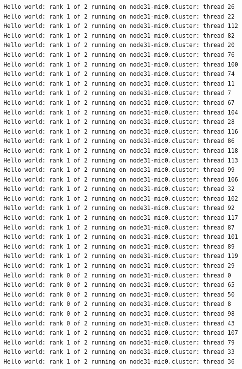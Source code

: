 \documentclass[pscyr,10pt]{hedlab}
\begin{document}
\begin{lstlisting}
  Hello world: rank 1 of 2 running on node31-mic0.cluster: thread 26
  Hello world: rank 1 of 2 running on node31-mic0.cluster: thread 22
  Hello world: rank 1 of 2 running on node31-mic0.cluster: thread 112
  Hello world: rank 1 of 2 running on node31-mic0.cluster: thread 82
  Hello world: rank 1 of 2 running on node31-mic0.cluster: thread 20
  Hello world: rank 1 of 2 running on node31-mic0.cluster: thread 76
  Hello world: rank 1 of 2 running on node31-mic0.cluster: thread 100
  Hello world: rank 1 of 2 running on node31-mic0.cluster: thread 74
  Hello world: rank 1 of 2 running on node31-mic0.cluster: thread 11
  Hello world: rank 1 of 2 running on node31-mic0.cluster: thread 7
  Hello world: rank 1 of 2 running on node31-mic0.cluster: thread 67
  Hello world: rank 1 of 2 running on node31-mic0.cluster: thread 104
  Hello world: rank 1 of 2 running on node31-mic0.cluster: thread 28
  Hello world: rank 1 of 2 running on node31-mic0.cluster: thread 116
  Hello world: rank 1 of 2 running on node31-mic0.cluster: thread 86
  Hello world: rank 1 of 2 running on node31-mic0.cluster: thread 118
  Hello world: rank 1 of 2 running on node31-mic0.cluster: thread 113
  Hello world: rank 1 of 2 running on node31-mic0.cluster: thread 99
  Hello world: rank 1 of 2 running on node31-mic0.cluster: thread 106
  Hello world: rank 1 of 2 running on node31-mic0.cluster: thread 32
  Hello world: rank 1 of 2 running on node31-mic0.cluster: thread 102
  Hello world: rank 1 of 2 running on node31-mic0.cluster: thread 92
  Hello world: rank 1 of 2 running on node31-mic0.cluster: thread 117
  Hello world: rank 1 of 2 running on node31-mic0.cluster: thread 87
  Hello world: rank 1 of 2 running on node31-mic0.cluster: thread 101
  Hello world: rank 1 of 2 running on node31-mic0.cluster: thread 89
  Hello world: rank 1 of 2 running on node31-mic0.cluster: thread 119
  Hello world: rank 1 of 2 running on node31-mic0.cluster: thread 29
  Hello world: rank 0 of 2 running on node31-mic0.cluster: thread 0
  Hello world: rank 0 of 2 running on node31-mic0.cluster: thread 65
  Hello world: rank 0 of 2 running on node31-mic0.cluster: thread 50
  Hello world: rank 0 of 2 running on node31-mic0.cluster: thread 8
  Hello world: rank 0 of 2 running on node31-mic0.cluster: thread 98
  Hello world: rank 0 of 2 running on node31-mic0.cluster: thread 43
  Hello world: rank 1 of 2 running on node31-mic0.cluster: thread 107
  Hello world: rank 1 of 2 running on node31-mic0.cluster: thread 79
  Hello world: rank 1 of 2 running on node31-mic0.cluster: thread 33
  Hello world: rank 1 of 2 running on node31-mic0.cluster: thread 36

\end{lstlisting}
\end{document}
